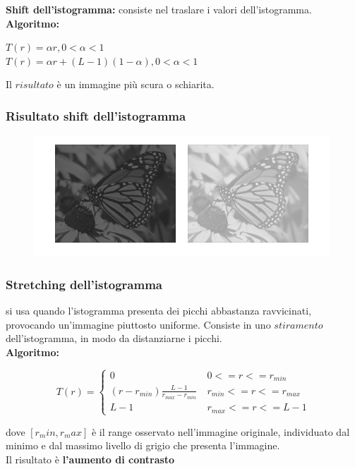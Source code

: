 \textbf{Shift dell'istogramma:} consiste nel traslare i valori dell'istogramma.
\\\textbf{Algoritmo:}
\begin{center}
    $T(r) = \alpha r, 0 < \alpha < 1$
    \\
    $T(r) = \alpha r + (L-1)(1-\alpha), 0<\alpha<1$
\end{center}
Il $risultato$ è un immagine più scura o schiarita.

\subsubsection{Risultato shift dell'istogramma}

\begin{figure}[H]
    \centering
    \includegraphics[width=\linewidth, keepaspectratio]{capitoli/immagini/imgs/shift-isto.png}
\end{figure}

\subsubsection{Stretching dell'istogramma}

si usa quando l'istogramma presenta dei picchi abbastanza ravvicinati, provocando un'immagine
piuttosto uniforme. Consiste in uno $stiramento$ dell'istogramma, in modo da distanziarne i picchi.
\\\textbf{Algoritmo:}
\begin{center}
    $$
        T(r) = \left\{ \begin{array}{cl}
            0                                         & \ 0 <= r <= r_{min}       \\
            (r - r_{min}) \frac{L-1}{r_{max}-r_{min}} & \ r_{min} <= r <= r_{max} \\
            L-1                                       & \ r_{max} <= r <= L-1
        \end{array} \right.
    $$
\end{center}
dove $[r_min, r_max ]$ è il range osservato nell'immagine originale, individuato dal minimo e dal massimo livello di grigio che presenta
l'immagine.
\\Il risultato è \textbf{l'aumento di contrasto}

